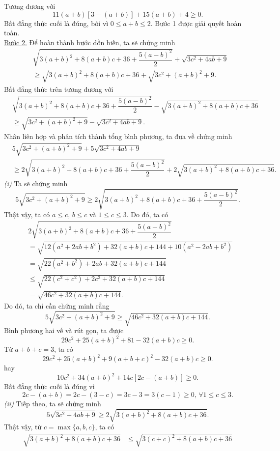 {\begin{bt}
{		Tương đương với $$11(a+b)\left[3-(a+b)\right]+15(a+b)+4\geq 0.$$
		Bất đẳng thức cuối là đúng, bởi vì $0\leq a+b\leq 2$.  Bước 1 được giải quyết hoàn toàn.\\
		\underline{Bước 2.} Để  hoàn thành bước dồn biến, ta sẽ chứng minh
		\begin{align*}
		& \sqrt{3(a+b)^2+8(a+b)c+36+\dfrac{5(a-b)^2}{2}}+\sqrt{3c^2+4ab+9} \\
		& \geq \sqrt{3(a+b)^2+8(a+b)c+36}+\sqrt{3c^2+(a+b)^2+9}.
		\end{align*}
		Bất đẳng thức trên tương đương với
		\begin{align*}
		& \sqrt{3(a+b)^2+8(a+b)c+36+\dfrac{5(a-b)^2}{2}}-\sqrt{3(a+b)^2+8(a+b)c+36} \\
		& \geq \sqrt{3c^2+(a+b)^2+9}-\sqrt{3c^2+4ab+9}.
		\end{align*}
		Nhân liên hợp và phân tích thành tổng bình phương, ta đưa về chứng minh
		\begin{align}
		& 5\sqrt{3c^2+(a+b)^2+9}+5\sqrt{3c^2+4ab+9} \nonumber \\
		& \geq 2\sqrt{3(a+b)^2+8(a+b)c+36+\dfrac{5(a-b)^2}{2}}+2\sqrt{3(a+b)^2+8(a+b)c+36}.\tag{2}
		\end{align}
		\textit{(i)} Ta sẽ chứng minh $$5\sqrt{3c^2+(a+b)^2+9}\geq 2\sqrt{3(a+b)^2+8(a+b)c+36+\dfrac{5(a-b)^2}{2}}.$$
		Thật vậy, ta có $a\leq c,\, b\leq c$ và $1\leq c\leq 3$. Do đó, ta có
		\begin{align*}
		& 2\sqrt{3(a+b)^2+8(a+b)c+36+\dfrac{5(a-b)^2}{2}} \\ &=\sqrt{12(a^2+2ab+b^2)+32(a+b)c+144+10(a^2-2ab+b^2)} \\
		& =\sqrt{22(a^2+b^2)+2ab+32(a+b)c+144} \\
		& \leq \sqrt{22(c^2+c^2)+2c^2+32(a+b)c+144} \\
		& =\sqrt{46c^2+32(a+b)c+144}.
		\end{align*}
		Do đó, ta chỉ cần chứng minh rằng $$5\sqrt{3c^2+(a+b)^2+9}\geq \sqrt{46c^2+32(a+b)c+144}.$$
		Bình phương hai vế và rút gọn, ta được $$29c^2+25(a+b)^2+81-32(a+b)c\geq 0.$$
		Từ $a+b+c=3$, ta có $$29c^2+25(a+b)^2+9(a+b+c)^2-32(a+b)c\geq 0.$$
		hay $$10c^2+34(a+b)^2+14c\left[2c-(a+b)\right]\geq 0.$$
		Bất đẳng thức cuối là đúng vì $$2c-(a+b)=2c-(3-c)=3c-3=3(c-1)\geq 0,\, \forall 1\leq c\leq 3.$$
		\textit{(ii)} Tiếp theo, ta sẽ chứng minh $$5\sqrt{3c^2+4ab+9}\geq 2\sqrt{3(a+b)^2+8(a+b)c+36}.$$
		Thật vậy, từ $c=\max \{a,b,c\}$, ta có
		\begin{align*}
		\sqrt{3(a+b)^2+8(a+b)c+36} & \leq \sqrt{3(c+c)^2+8(a+b)c+36} \\

\end{align*}}
\end{bt}}
